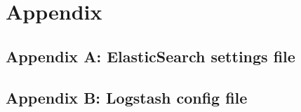 \chapter{Appendix}

\section{Appendix A: ElasticSearch settings file}
\label{sec:appendix-a}


\pagebreak
\section{Appendix B: Logstash config file}
\label{sec:appendix-b}

